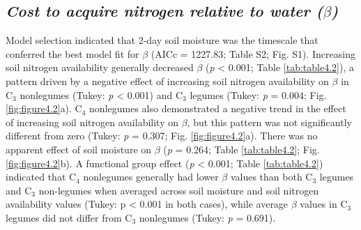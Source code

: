 \subsection{\textit{Cost to acquire nitrogen relative to water ($\beta$)}}
Model selection indicated that 2-day soil moisture was the timescale that conferred the best model fit for $\beta$ (AICc = 1227.83; Table S2; Fig. S1). Increasing soil nitrogen availability generally decreased $\beta$ (\textit{p} < 0.001; Table \ref{tab:table4.2}), a pattern driven by a negative effect of increasing soil nitrogen availability on $\beta$ in C$_3$ nonlegumes (Tukey: \textit{p} < 0.001) and C$_3$ legumes (Tukey: \textit{p} = 0.004; Fig. \ref{fig:figure4.2}a). C$_4$ nonlegumes also demonstrated a negative trend in the effect of increasing soil nitrogen availability on $\beta$, but this pattern was not significantly different from zero (Tukey: \textit{p} = 0.307; Fig. \ref{fig:figure4.2}a). There was no apparent effect of soil moisture on $\beta$ (\textit{p} = 0.264; Table \ref{tab:table4.2}; Fig. \ref{fig:figure4.2}b). A functional group effect (\textit{p} < 0.001; Table \ref{tab:table4.2}) indicated that C$_4$ nonlegumes generally had lower $\beta$ values than both C$_3$ legumes and C$_3$ non-legumes when averaged across soil moisture and soil nitrogen availability values (Tukey: p < 0.001 in both cases), while average $\beta$ values in C$_3$ legumes did not differ from C$_3$ nonlegumes (Tukey: \textit{p} = 0.691).

